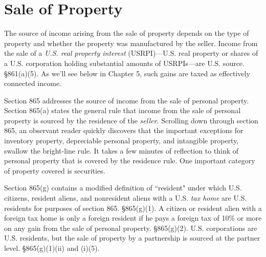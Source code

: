  
\section{Sale of Property}

The source of income arising from the sale of property depends on the type of property and whether the property was manufactured by the seller.  Income from the sale of a \emph{U.S. real property interest} (USRPI)---U.S. real property or shares of a U.S. corporation holding substantial amounts of USRPIs---are U.S. source.  \S861(a)(5).  As we'll see below in Chapter 5, such gains are taxed as effectively connected income.  

Section 865 addresses the source of income from the sale of personal property.  Section 865(a) states the general rule that income from the sale of personal property is sourced by the residence of the \emph{seller.}  Scrolling down through section 865, an observant reader quickly discovers that the important exceptions for inventory property, depreciable personal property, and intangible property, swallow the bright-line rule.  It takes a few minutes of reflection to think of personal property that is covered by the residence rule.  One important category of property covered is securities.  

Section 865(g) contains a modified definition of ``resident" under which U.S. citizens, resident aliens, and nonresident aliens with a U.S. \emph{tax home} are U.S. residents for purposes of section 865. \S865(g)(1).   A citizen or resident alien with a foreign tax home is only a foreign resident if he pays a foreign tax of 10\% or more on any gain from the sale of personal property. \S865(g)(2).  U.S. corporations are U.S. residents, but the sale of property by a partnership is sourced at the partner level.  \S865(g)(1)(ii) and (i)(5).  

